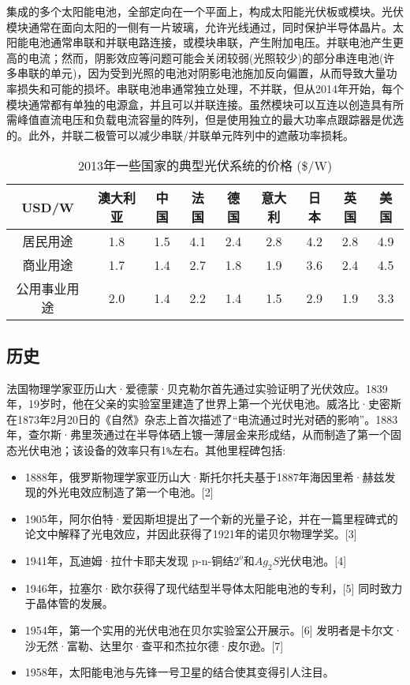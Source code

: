 集成的多个太阳能电池，全部定向在一个平面上，构成太阳能光伏板或模块。光伏模块通常在面向太阳的一侧有一片玻璃，允许光线通过，同时保护半导体晶片。太阳能电池通常串联和并联电路连接，或模块串联，产生附加电压。并联电池产生更高的电流；然而，阴影效应等问题可能会关闭较弱(光照较少)的部分串连电池(许多串联的单元)，因为受到光照的电池对阴影电池施加反向偏置，从而导致大量功率损失和可能的损坏。串联电池串通常独立处理，不并联，但从2014年开始，每个模块通常都有单独的电源盒，并且可以并联连接。虽然模块可以互连以创造具有所需峰值直流电压和负载电流容量的阵列，但是使用独立的最大功率点跟踪器是优选的。此外，并联二极管可以减少串联/并联单元阵列中的遮蔽功率损耗。

\begin{table}[ht]
\centering
\caption{2013年一些国家的典型光伏系统的价格 (\$/W)}\label{tab_TYMDZ}
\begin{tabular}{|c|c|c|c|c|c|c|c|c}
\hline
USD/W&澳大利亚&中国	&法国 & 德国 & 意大利 & 日本 & 英国 & 美国 \\
\hline
居民用途 & 1.8 & 1.5 & 4.1 & 2.4 & 2.8 & 4.2 & 2.8 & 4.9 \\
\hline
商业用途 & 1.7 & 1.4& 2.7 & 1.8 & 1.9 & 3.6 & 2.4 & 4.5 \\
\hline
公用事业用途 & 2.0 & 1.4 & 2.2 & 1.4 & 1.5 & 2.9 & 1.9 & 3.3 \\
\hline
\end{tabular}
\end{table}


\subsection{历史}

法国物理学家亚历山大·爱德蒙·贝克勒尔首先通过实验证明了光伏效应。1839年，19岁时，他在父亲的实验室里建造了世界上第一个光伏电池。威洛比·史密斯在1873年2月20日的《自然》杂志上首次描述了“电流通过时光对硒的影响”。1883年，查尔斯·弗里茨通过在半导体硒上镀一薄层金来形成结，从而制造了第一个固态光伏电池；该设备的效率只有1\verb`%`左右。其他里程碑包括:

\begin{itemize}
\item 1888年，俄罗斯物理学家亚历山大·斯托尔托夫基于1887年海因里希·赫兹发现的外光电效应制造了第一个电池。[2]
\item 1905年，阿尔伯特·爱因斯坦提出了一个新的光量子论，并在一篇里程碑式的论文中解释了光电效应，并因此获得了1921年的诺贝尔物理学奖。[3]
\item 1941年，瓦迪姆·拉什卡耶夫发现 p-n-铜结$2^o$和$Ag_2S$光伏电池。[4]
\item 1946年，拉塞尔·欧尔获得了现代结型半导体太阳能电池的专利，[5] 同时致力于晶体管的发展。
\item 1954年，第一个实用的光伏电池在贝尔实验室公开展示。[6] 发明者是卡尔文·沙无然·富勒、达里尔·查平和杰拉尔德·皮尔逊。[7]
\item 1958年，太阳能电池与先锋一号卫星的结合使其变得引人注目。
\end{itemize}


